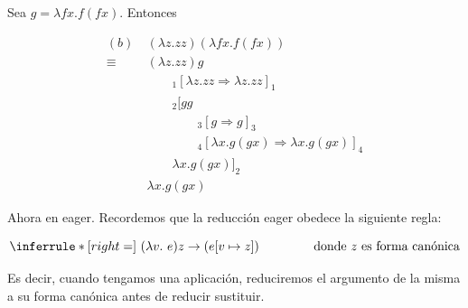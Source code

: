 \documentclass[article, 12pt]{article}
\begin{document}
Sea $g = \lambda fx.f(fx)$. Entonces

\begin{align*}
  (b) ~ 
  &(\lambda z. zz)(\lambda fx. f(fx)) \\ 
  \equiv& (\lambda z.zz) g \\ 
&\qquad_1[\lambda z. zz \Rightarrow \lambda z. zz]_1 \\ 
&\qquad _2[g g \\ 
&\qquad \qquad _3[ g \Rightarrow g ]_3 \\ 
&\qquad \qquad  _4[\lambda x. g(gx) \Rightarrow \lambda x. g(gx)]_4 \\ 
&\qquad \lambda x. g(gx) ]_2 \\ 
&\lambda x. g(gx)
\end{align*}

Ahora en eager. Recordemos que la reducción eager obedece la siguiente regla:


\begin{equation*}
\inferrule* [right=] {~}{(\lambda v.\ e)z \to (e[v \mapsto z]) \qquad \qquad
\text{ donde } z \text{ es forma canónica}}
\end{equation*}

Es decir, cuando tengamos una aplicación, reduciremos el argumento de la misma a
su forma canónica antes de reducir sustituir.
\end{document}
